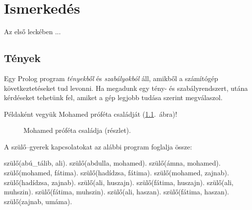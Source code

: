 
\chapter{Ismerkedés}

Az első leckében ...

\section{Tények}

Egy Prolog program \emph{tényekből} és
\emph{szabályokból} áll, amikből a számítógép
következtetéseket tud levonni. Ha megadunk egy
tény- és szabályrendszert, utána kérdéseket
tehetünk fel, amiket a gép legjobb tudása szerint
megválaszol.

Példaként vegyük Mohamed próféta családját
(\ref{fig:csaladfa}.~ábra)!
%
\begin{figure}
  \centering
  \caption{Mohamed próféta családja (részlet).}
  \label{fig:csaladfa}
\end{figure}
%
A szülő--gyerek kapcsolatokat az alábbi program
foglalja össze:

\begin{prolog}
szülő(abú_tálib, ali).
szülő(abdulla, mohamed).
szülő(ámna, mohamed).
szülő(mohamed, fátima).
szülő(hadídzsa, fátima).
szülő(mohamed, zajnab).
szülő(hadídzsa, zajnab).
szülő(ali, huszajn).
szülő(fátima, huszajn).
szülő(ali, muhszin).
szülő(fátima, muhszin).
szülő(ali, haszan).
szülő(fátima, haszan).
szülő(zajnab, umáma).
\end{prolog}

